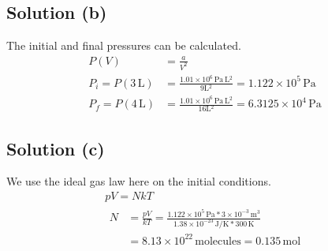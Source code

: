 \documentclass[12pt]{article}
\newcommand{\E}[1]{\times 10^{#1}}
\begin{document}
        \subsection{Solution (b)}
            The initial and final pressures can be calculated.
            \begin{align}
                P(V)    &=  \frac{a}{V^2}\\
                P_i =   P(3\,\unit{\liter}) &=  \frac{1.01\E{6}\,\unit{\pascal\,\liter^2}}{9\unit{\liter^2}}
                    =   1.122\E{5}\,\unit{\pascal}\\
                P_f =   P(4\,\unit{\liter}) &=  \frac{1.01\E{6}\,\unit{\pascal\,\liter^2}}{16\unit{\liter^2}}
                    =   6.3125\E{4}\,\unit{\pascal}
            \end{align}

        \subsection{Solution (c)}
            We use the ideal gas law here on the initial conditions.
            \begin{gather}
                pV  =   NkT\\
                \begin{align}
                    N   &=  \frac{pV}{kT}
                        =   \frac{1.122\E{5}\,\unit{\pascal} * 3\E{-3}\,\unit{\meter^3}}{1.38\E{-23}\,\unit{\joule/\kelvin} * 300\,\unit{\kelvin}}\\
                        &=  8.13\E{22}\,\text{molecules}
                        =   \boxed{0.135\,\unit{\mole}}
                \end{align}
            \end{gather}
\end{document}
